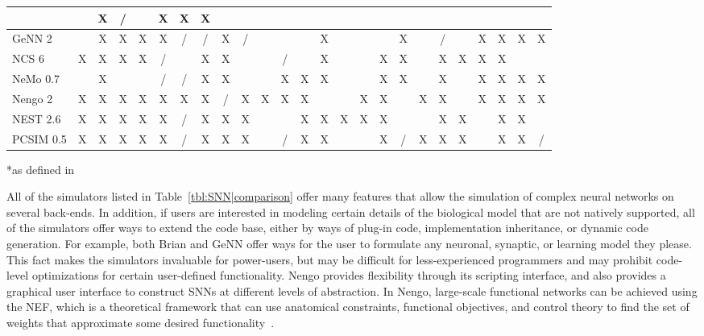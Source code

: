 {\begin{sidewaystable}[h]
\begin{tabular}{|l|c|c|c|c|c|c|c|c|c|c|c|c|c|c|c|c|c|c|c|c|c|c|c|c|}
            &   & X & / &   & X & X & X \\ %
 \hline
 GeNN 2     
            &   & X & X & X & X & / & / & X    %
            & / &   &   &   & X &   &   &   & X    %
            &   & / &   & X & X & X & X \\ %
 \hline
 NCS 6      
            & X & X & X & X & / &   & X & X    %
            &   &   & / &   & X &   &   & X & X    %
            &   & X & X & X & X &   &   \\ %
 \hline
 NeMo 0.7   
            &   & X &   &   & / & / & X & X    %
            &   &   & X & X & X &   &   & X & X    %
            &   & X &   & X & X & X & X \\ %
 \hline
 Nengo 2    
            & X & X & X & X & X & X & X & /    %
            & X & X & X & X &   &   & X & X &      %
            & X & X &   & X & X & X & X \\ %
 \hline
 NEST 2.6   
            & X & X & X & X & X & / & X & X    %
            & X &   &   & X & X & X & X & X &      %
            &   & X & X &   & X & X &   \\ %
 \hline
 PCSIM 0.5  
            & X & X & X & X & X & / & X & X    %
            & X &   & / & X & X &   &   & X & /    %
            & X & X & X &   & X & X & / \\ %
 \hline
 \end{tabular}
 
 *as defined in ~\citet{Rotter1999}
 \label{tbl:SNN|comparison}
\end{sidewaystable}
\clearpage
}

All of the simulators listed in Table~\ref{tbl:SNN|comparison}
offer many features
that allow the simulation of complex neural networks on
several back-ends. In addition, if users are interested in
modeling certain details of the biological model that are not
natively supported, all of the simulators offer ways to extend
the code base, either by ways of plug-in code, implementation
inheritance, or dynamic code generation. For example, both
Brian and GeNN offer ways for the user to formulate any
neuronal, synaptic, or learning model they please. This fact
makes the simulators invaluable for power-users, but may be
difficult for less-experienced programmers and may prohibit
code-level optimizations for certain user-defined functionality.
Nengo provides flexibility through its scripting interface, and
also provides a graphical user interface to construct \acp{SNN} at
different levels of abstraction. In Nengo, large-scale functional
networks can be achieved using the \ac{NEF},
which is a theoretical framework that can
use anatomical constraints, functional objectives, and control
theory to find the set of weights that approximate some
desired functionality~\citep{Eliasmith2002}.

